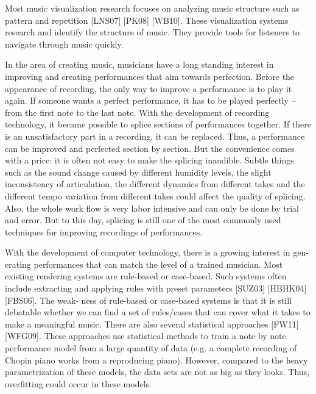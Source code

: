 \documentclass[12pt]{article}
\begin{document}
Most music visualization research focuses on analyzing music structure
such as pattern and repetition [LNS07] [PK08] [WB10]. These
visualization systems research and identify the structure of
music. They provide tools for listeners to navigate through music
quickly. 

In the area of creating music, musicians have a long standing interest
in improving and creating performances that aim towards
perfection. Before the appearance of recording, the only way to
improve a performance is to play it again. If someone wants a perfect
performance, it has to be played perfectly – from the first note to
the last note. With the development of recording technology, it became
possible to splice sections of performances together. If there is an
unsatisfactory part in a recording, it can be replaced. Thus, a
performance can be improved and perfected section by section. But the
convenience comes with a price: it is often not easy to make the
splicing inaudible. Subtle things such as the sound change caused by
different humidity levels, the slight inconsistency of articulation,
the different dynamics from different takes and the different tempo
variation from different takes could affect the quality of
splicing. Also, the whole work flow is very labor intensive and can
only be done by trial and error. But to this day, splicing is still
one of the most commonly used techniques for improving recordings of
performances. 

With the development of computer technology, there is a growing
interest in gen- erating performances that can match the level of a
trained musician. Most existing rendering systems are rule-based or
case-based. Such systems often include extracting and applying rules
with preset parameters [SUZ03] [HBHK04] [FBS06]. The weak- ness of
rule-based or case-based systems is that it is still debatable whether
we can find a set of rules/cases that can cover what it takes to make
a meaningful music. There are also several statistical approaches
[FW11] [WFG09]. These approaches use statistical methods to train a
note by note performance model from a large quantity of data (e.g. a
complete recording of Chopin piano works from a reproducing
piano). However, compared to the heavy parametrization of these
models, the data sets are not as big as they looks. Thus, overfitting
could occur in these models. 
\end{document}
